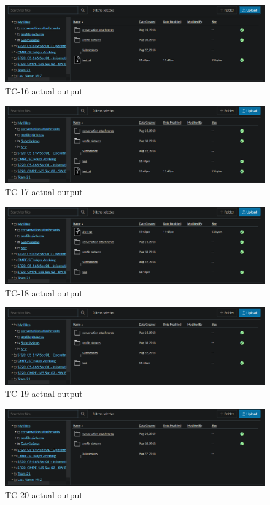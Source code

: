\documentclass[10pt,letterpaper]{article}
\begin{document}
\newpage
\begin{figure}[h!]
	\centerline{\includegraphics[width=\textwidth]{screenshots/tc16-actual-output.png}}
	\caption{TC-16 actual output}
\end{figure}
\begin{figure}[h!]
	\centerline{\includegraphics[width=\textwidth]{screenshots/tc17-actual-output.png}}
	\caption{TC-17 actual output}
\end{figure}
\begin{figure}[h!]
	\centerline{\includegraphics[width=\textwidth]{screenshots/tc18-actual-output.png}}
	\caption{TC-18 actual output}
\end{figure}
\pagebreak
\begin{figure}[h!]
	\centerline{\includegraphics[width=\textwidth]{screenshots/tc19-actual-output.png}}
	\caption{TC-19 actual output}
\end{figure}
\begin{figure}[h!]
	\centerline{\includegraphics[width=\textwidth]{screenshots/tc20-actual-output.png}}
	\caption{TC-20 actual output}
\end{figure}
\end{document}
